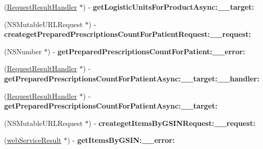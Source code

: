 \begin{DoxyCompactItemize}
\item 
\hypertarget{interface_supply_chain_service_port_binding_a52ff0cf3b58ee21b82692fd74a316321}{}(\hyperlink{interface_request_result_handler}{Request\+Result\+Handler} $\ast$) -\/ {\bfseries get\+Logistic\+Units\+For\+Product\+Async\+:\+\_\+\+\_\+target\+:}\label{interface_supply_chain_service_port_binding_a52ff0cf3b58ee21b82692fd74a316321}

\item 
\hypertarget{interface_supply_chain_service_port_binding_a7f65912bd592b332197ec6f80a3711ef}{}(N\+S\+Mutable\+U\+R\+L\+Request $\ast$) -\/ {\bfseries createget\+Prepared\+Prescriptions\+Count\+For\+Patient\+Request\+:\+\_\+\+\_\+request\+:}\label{interface_supply_chain_service_port_binding_a7f65912bd592b332197ec6f80a3711ef}

\item 
\hypertarget{interface_supply_chain_service_port_binding_aa46652a238445b234ce67456f00b827a}{}(N\+S\+Number $\ast$) -\/ {\bfseries get\+Prepared\+Prescriptions\+Count\+For\+Patient\+:\+\_\+\+\_\+error\+:}\label{interface_supply_chain_service_port_binding_aa46652a238445b234ce67456f00b827a}

\item 
\hypertarget{interface_supply_chain_service_port_binding_a9286747f81c32087c1e8c650c80c2c52}{}(\hyperlink{interface_request_result_handler}{Request\+Result\+Handler} $\ast$) -\/ {\bfseries get\+Prepared\+Prescriptions\+Count\+For\+Patient\+Async\+:\+\_\+\+\_\+target\+:\+\_\+\+\_\+handler\+:}\label{interface_supply_chain_service_port_binding_a9286747f81c32087c1e8c650c80c2c52}

\item 
\hypertarget{interface_supply_chain_service_port_binding_a3112682fa99ce2725feffe372c65e72d}{}(\hyperlink{interface_request_result_handler}{Request\+Result\+Handler} $\ast$) -\/ {\bfseries get\+Prepared\+Prescriptions\+Count\+For\+Patient\+Async\+:\+\_\+\+\_\+target\+:}\label{interface_supply_chain_service_port_binding_a3112682fa99ce2725feffe372c65e72d}

\item 
\hypertarget{interface_supply_chain_service_port_binding_a4f87161ac0b24ab66f7aadaafc49752f}{}(N\+S\+Mutable\+U\+R\+L\+Request $\ast$) -\/ {\bfseries createget\+Items\+By\+G\+S\+I\+N\+Request\+:\+\_\+\+\_\+request\+:}\label{interface_supply_chain_service_port_binding_a4f87161ac0b24ab66f7aadaafc49752f}

\item 
\hypertarget{interface_supply_chain_service_port_binding_a5b93be942a0a2148025e1e0e8453f8f9}{}(\hyperlink{interfaceweb_service_result}{web\+Service\+Result} $\ast$) -\/ {\bfseries get\+Items\+By\+G\+S\+I\+N\+:\+\_\+\+\_\+error\+:}\label{interface_supply_chain_service_port_binding_a5b93be942a0a2148025e1e0e8453f8f9}


\end{DoxyCompactItemize}
